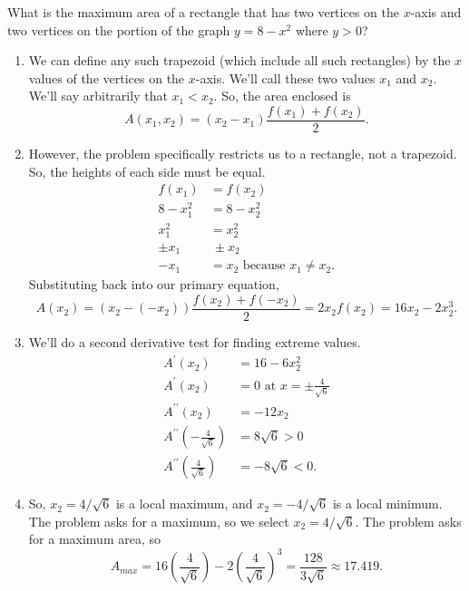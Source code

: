 \begin{example}
	What is the maximum area of a rectangle that has two vertices on the $x$-axis and two vertices on the portion of the graph $y=8-x^2$ where $y > 0$?
\end{example}
\begin{answer}
	\begin{enumerate}
		\item We can define any such trapezoid (which include all such rectangles) by the $x$ values of the vertices on the $x$-axis.
			We'll call these two values $x_1$ and $x_2$.
			We'll say arbitrarily that $x_1 < x_2$.
			So, the area enclosed is
			\begin{equation*}
				A(x_1, x_2) = (x_2 - x_1)\frac{f(x_1) + f(x_2)}{2}.
			\end{equation*}
		\item However, the problem specifically restricts us to a rectangle, not a trapezoid.
			So, the heights of each side must be equal.
			\begin{align*}
				f(x_1) &= f(x_2) \\
				8 - x_1^2 &= 8 - x_2^2 \\
				x_1^2 &= x_2^2 \\
				\pm x_1 &\ \pm x_2 \\
				-x_1 &= x_2 \text{ because $x_1 \neq x_2$}.
			\end{align*}
			Substituting back into our primary equation,
			\begin{equation*}
				A(x_2) = (x_2 - (-x_2))\frac{f(x_2) + f(-x_2)}{2} = 2x_2f(x_2) = 16x_2 - 2x_2^3.
			\end{equation*}
		\item We'll do a second derivative test for finding extreme values.
			\begin{align*}
				A^\prime(x_2) &= 16 - 6x_2^2 \\
				A^\prime(x_2) &= 0 \text{ at } x = \pm\frac{4}{\sqrt{6}} \\
				A^{\prime\prime}(x_2) &= -12x_2 \\
				A^{\prime\prime}\left(-\frac{4}{\sqrt{6}}\right) &= 8\sqrt{6} > 0 \\
				A^{\prime\prime}\left(\frac{4}{\sqrt{6}}\right) &= -8\sqrt{6} < 0.
			\end{align*}
		\item So, $x_2 = 4/\sqrt{6}$ is a local maximum, and $x_2 = -4/\sqrt{6}$ is a local minimum.
			The problem asks for a maximum, so we select $x_2 = 4/\sqrt{6}$.
			The problem asks for a maximum area, so
			\begin{equation*}
				A_{max} = 16\left(\frac{4}{\sqrt{6}}\right) - 2\left(\frac{4}{\sqrt{6}}\right)^3 = \frac{128}{3\sqrt{6}} \approx 17.419.
			\end{equation*}
	\end{enumerate}
\end{answer}